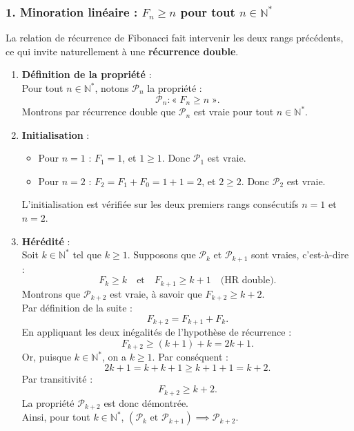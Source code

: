 \documentclass[11pt,a4paper]{article}
\newcommand{\N}{\mathbb{N}}
\begin{document}
\begin{correctionbox}
\subsubsection*{1. Minoration linéaire : $F_n \ge n$ pour tout $n \in \N^*$}

La relation de récurrence de Fibonacci fait intervenir les deux rangs précédents, ce qui invite naturellement à une \textbf{récurrence double}.

\begin{enumerate}[label=\textbf{\arabic*.}]
    \item \textbf{Définition de la propriété} :\\
    Pour tout $n \in \N^*$, notons $\mathcal{P}_n$ la propriété :
    \[
    \mathcal{P}_n : « \; F_n \ge n \; ».
    \]
    Montrons par récurrence double que $\mathcal{P}_n$ est vraie pour tout $n \in \N^*$.

    \item \textbf{Initialisation} :
    \begin{itemize}
        \item Pour $n = 1$ : $F_1 = 1$, et $1 \ge 1$. Donc $\mathcal{P}_1$ est vraie.
        \item Pour $n = 2$ : $F_2 = F_1 + F_0 = 1 + 1 = 2$, et $2 \ge 2$. Donc $\mathcal{P}_2$ est vraie.
    \end{itemize}
    L'initialisation est vérifiée sur les deux premiers rangs consécutifs $n=1$ et $n=2$.

    \item \textbf{Hérédité} :\\
    Soit $k \in \N^*$ tel que $k \ge 1$. Supposons que $\mathcal{P}_k$ et $\mathcal{P}_{k+1}$ sont vraies, c'est-à-dire :
    \[
    F_k \ge k \quad \text{et} \quad F_{k+1} \ge k+1 \quad \text{(HR double)}.
    \]
    Montrons que $\mathcal{P}_{k+2}$ est vraie, à savoir que $F_{k+2} \ge k+2$.\\
    Par définition de la suite :
    \[
    F_{k+2} = F_{k+1} + F_k.
    \]
    En appliquant les deux inégalités de l'hypothèse de récurrence :
    \[
    F_{k+2} \ge (k+1) + k = 2k + 1.
    \]
    Or, puisque $k \in \N^*$, on a $k \ge 1$. Par conséquent :
    \[
    2k + 1 = k + k + 1 \ge k + 1 + 1 = k + 2.
    \]
    Par transitivité :
    \[
    F_{k+2} \ge k+2.
    \]
    La propriété $\mathcal{P}_{k+2}$ est donc démontrée.\\
    Ainsi, pour tout $k \in \N^*$, $(\mathcal{P}_k \text{ et } \mathcal{P}_{k+1}) \implies \mathcal{P}_{k+2}$.


\end{enumerate}
\end{correctionbox}
\end{document}
